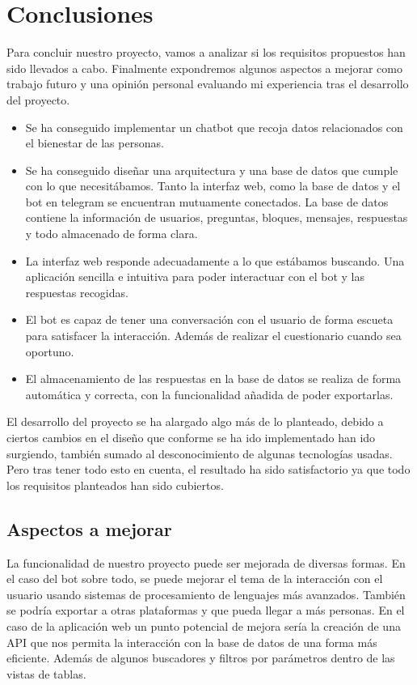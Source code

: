 \chapter{Conclusiones}

Para concluir nuestro proyecto, vamos a analizar si los requisitos propuestos han sido llevados a cabo. Finalmente expondremos algunos aspectos a mejorar como trabajo futuro y una opinión personal evaluando mi experiencia tras el desarrollo del proyecto. 

\begin{itemize}
    \item Se ha conseguido implementar un chatbot que recoja datos relacionados con el bienestar de las personas.
    \item Se ha conseguido diseñar una arquitectura y una base de datos que cumple con lo que necesitábamos. Tanto la interfaz web, como la base de datos y el bot en telegram se encuentran mutuamente conectados. La base de datos contiene la información  de usuarios, preguntas, bloques, mensajes, respuestas y todo almacenado de forma clara. 
    \item La interfaz web responde adecuadamente a lo que estábamos buscando. Una aplicación sencilla e intuitiva para poder interactuar con el bot y las respuestas recogidas.
    \item El bot es capaz de tener una conversación con el usuario de forma escueta para satisfacer la interacción. Además de realizar el cuestionario cuando sea oportuno.
    \item El almacenamiento de las respuestas en la base de datos se realiza de forma automática y correcta, con la funcionalidad añadida de poder exportarlas.
\end{itemize}

El desarrollo del proyecto se ha alargado algo más de lo planteado, debido a ciertos cambios en el diseño que conforme se ha ido implementado han ido surgiendo, también sumado al desconocimiento de algunas tecnologías usadas. Pero tras tener todo esto en cuenta, el resultado ha sido satisfactorio ya que todo los requisitos planteados han sido cubiertos. 



 \section{Aspectos a mejorar}

La funcionalidad de nuestro proyecto puede ser mejorada de diversas formas. En el caso del bot sobre todo, se puede mejorar el tema de la interacción con el usuario usando sistemas de procesamiento de lenguajes más avanzados. También se podría exportar a otras plataformas y que pueda llegar a más personas. En el caso de la aplicación web un punto potencial de mejora sería la creación de una API que nos permita la interacción con la base de datos de una forma más eficiente. Además de algunos buscadores y filtros por parámetros dentro de las vistas de tablas. 


